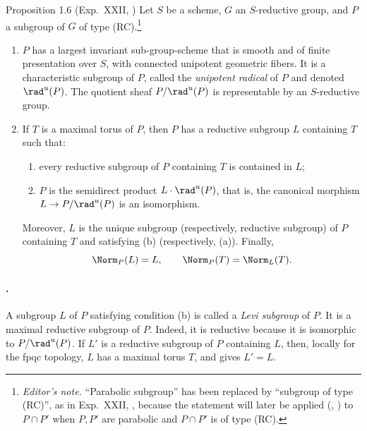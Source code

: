 \begin{sgastatement}{Proposition 1.6 \textup{(Exp.\ XXII, )}}
Let \(S\) be a scheme, \(G\) an \(S\)-reductive group, and \(P\) a subgroup
of \(G\) of type \textup{(RC)}.\footnote{\emph{Editor's note.}
``Parabolic subgroup'' has been replaced by ``subgroup of type (RC)'', as
in Exp.\ XXII, , because the statement will later be applied
(, ) to \(P\cap P'\) when \(P,P'\) are parabolic and
\(P\cap P'\) is of type (RC).}
\begin{enumerate}[label=\textup{(\roman*)}]
\item \(P\) has a largest invariant sub-group-scheme that is smooth and of
finite presentation over \(S\), with connected unipotent geometric fibers.
It is a characteristic subgroup of \(P\), called the \emph{unipotent
radical} of \(P\) and denoted \(\rad^u(P)\).  The quotient sheaf
\(P/\rad^u(P)\) is representable by an \(S\)-reductive group.
\item{} If \(T\) is a maximal torus of \(P\), then \(P\) has a reductive
subgroup \(L\) containing \(T\) such that:
\begin{enumerate}[label=\textup{(\alph*)}]
\item every reductive subgroup of \(P\) containing \(T\) is contained in
\(L\);
\item \(P\) is the semidirect product \(L\cdot\rad^u(P)\), that is, the
canonical morphism \(L\to P/\rad^u(P)\) is an isomorphism.
\end{enumerate}
Moreover, \(L\) is the unique subgroup \textup{(respectively, reductive
subgroup)} of \(P\) containing \(T\) and satisfying (b) \textup{(respectively,
(a))}.  Finally,
\[
 \Norm_P(L)=L,\qquad \Norm_P(T)=\Norm_L(T).
\]
\end{enumerate}
\end{sgastatement}

\paragraph{.}
A subgroup \(L\) of \(P\) satisfying condition (b) is called a
\emph{Levi subgroup} of \(P\).  It is a maximal reductive subgroup of
\(P\).  Indeed, it is reductive because it is isomorphic to
\(P/\rad^u(P)\).  If \(L'\) is a reductive subgroup of \(P\) containing
\(L\), then, locally for the fpqc topology, \(L\) has a maximal torus
\(T\), and  gives \(L'=L\).

